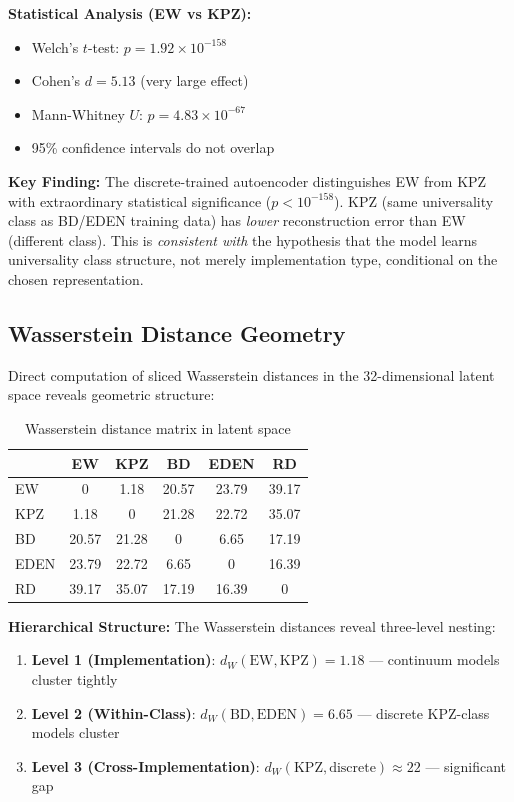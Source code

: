 \documentclass[aps,pre,reprint,amsmath,amssymb,superscriptaddress]{revtex4-2}
\newcommand{\EW}{\text{EW}}
\newcommand{\KPZ}{\text{KPZ}}
\begin{document}
\textbf{Statistical Analysis (EW vs KPZ):}
\begin{itemize}
\item Welch's $t$-test: $p = 1.92 \times 10^{-158}$
\item Cohen's $d = 5.13$ (very large effect)
\item Mann-Whitney $U$: $p = 4.83 \times 10^{-67}$
\item 95\% confidence intervals do not overlap
\end{itemize}

\textbf{Key Finding:} The discrete-trained autoencoder distinguishes EW from KPZ with extraordinary statistical significance ($p < 10^{-158}$). KPZ (same universality class as BD/EDEN training data) has \emph{lower} reconstruction error than EW (different class). This is \emph{consistent with} the hypothesis that the model learns universality class structure, not merely implementation type, conditional on the chosen representation.

\subsection{Wasserstein Distance Geometry}
\label{sec:wasserstein-empirical}

Direct computation of sliced Wasserstein distances in the 32-dimensional latent space reveals geometric structure:

\begin{table}[h]
\centering
\caption{Wasserstein distance matrix in latent space}
\label{tab:wasserstein}
\begin{tabular}{lccccc}
\toprule
& EW & KPZ & BD & EDEN & RD \\
\midrule
EW & 0 & 1.18 & 20.57 & 23.79 & 39.17 \\
KPZ & 1.18 & 0 & 21.28 & 22.72 & 35.07 \\
BD & 20.57 & 21.28 & 0 & 6.65 & 17.19 \\
EDEN & 23.79 & 22.72 & 6.65 & 0 & 16.39 \\
RD & 39.17 & 35.07 & 17.19 & 16.39 & 0 \\
\bottomrule
\end{tabular}
\end{table}

\textbf{Hierarchical Structure:} The Wasserstein distances reveal three-level nesting:
\begin{enumerate}
\item \textbf{Level 1 (Implementation)}: $d_W(\EW, \KPZ) = 1.18$ --- continuum models cluster tightly
\item \textbf{Level 2 (Within-Class)}: $d_W(\text{BD}, \text{EDEN}) = 6.65$ --- discrete KPZ-class models cluster
\item \textbf{Level 3 (Cross-Implementation)}: $d_W(\KPZ, \text{discrete}) \approx 22$ --- significant gap
\end{enumerate}
\end{document}
